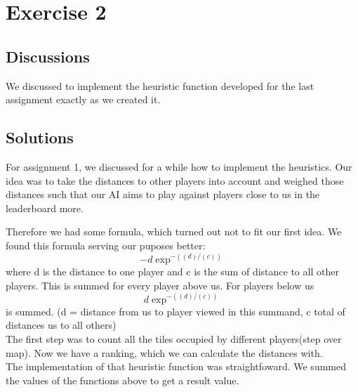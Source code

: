 \section{Exercise 2}
\subsection{Discussions}
We discussed to implement the heuristic function developed for the last assignment exactly as we created it. 

\subsection{Solutions}
For assignment 1, we discussed for a while how to implement the heuristics. Our idea was to take the distances to other players into account and weighed those distances such that our AI aims to play against players close to us in the leaderboard more.

Therefore we had some formula, which turned out not to fit our first idea. We found this formula serving our puposes better:
\[ -d \exp^{-((d)/(c))}\]
where d is the distance to one player and c is the sum of distance to all other players. This is summed for every player above us. For players below us
\[ d \exp^{-((d)/(c))}\]
is summed. (d = distance from us to player viewed in this summand, c total of distances us to all others)
\\ The first step was to count all the tiles occupied by different players(step over map). Now we have a ranking, which we can calculate the distances with.
\\ The implementation of that heuristic function was straightfoward. We summed the values of the functions above to get a result value.
